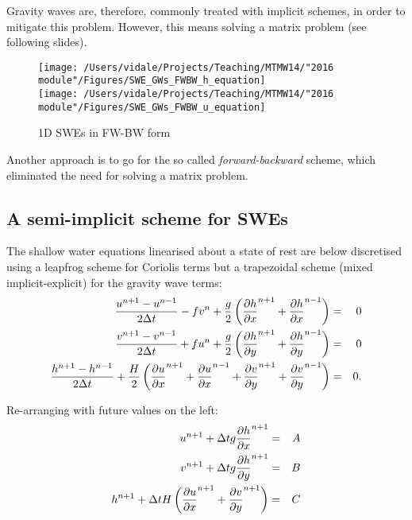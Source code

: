 \hfill

\begin{minipage}{0.55\textwidth}
	Gravity waves are, therefore, commonly treated with implicit schemes, in order to mitigate this problem. However, this means solving a matrix problem (see following slides).	
\end{minipage}

\begin{figure}
	\texttt{[image: /Users/vidale/Projects/Teaching/MTMW14/"2016 module"/Figures/SWE\_GWs\_FWBW\_h\_equation]}\\
	\texttt{[image: /Users/vidale/Projects/Teaching/MTMW14/"2016 module"/Figures/SWE\_GWs\_FWBW\_u\_equation]}
	\label{fig:Spherical}
	\caption{\label{fig:blue_rectangle} 1D SWEs in FW-BW form}
\end{figure}

Another approach is to go for the so called \emph{forward-backward} scheme, which eliminated the need for solving a matrix problem.


\subsection{A semi-implicit scheme for SWEs}

The shallow water equations linearised about a state of rest are below
discretised using a leapfrog scheme for Coriolis terms but a
trapezoidal scheme (mixed implicit-explicit) for the gravity wave
terms:
\begin{eqnarray*}
	\frac{u^{n+1}-u^{n-1}}{2\Delta t}-fv^n+\frac{g}{2}
	\left( \frac{\partial h}{\partial x}^{n+1} +\frac{\partial h}{\partial x}^{n-1} \right) & = & 0 \\
	\frac{v^{n+1}-v^{n-1}}{2\Delta t}+fu^n+\frac{g}{2}
	\left( \frac{\partial h}{\partial y}^{n+1} +\frac{\partial h}{\partial y}^{n-1} \right) & = & 0 \\
	\frac{h^{n+1}-h^{n-1}}{2\Delta t}+\frac{H}{2}
	\left( \frac{\partial u}{\partial x}^{n+1} +\frac{\partial u}{\partial x}^{n-1}
	+\frac{\partial v}{\partial y}^{n+1} +\frac{\partial v}{\partial y}^{n-1} 
	\right) & = & 0. 
\end{eqnarray*}

Re-arranging with future values on the left:
\begin{eqnarray*}
	u^{n+1}+\Delta t g \frac{\partial h}{\partial x}^{n+1} & = & A \\
	v^{n+1}+\Delta t g \frac{\partial h}{\partial y}^{n+1} & = & B \\
	h^{n+1}+\Delta t H \left( \frac{\partial u}{\partial x}^{n+1}+\frac{\partial v}{\partial y}^{n+1} \right) & = & C
\end{eqnarray*}

